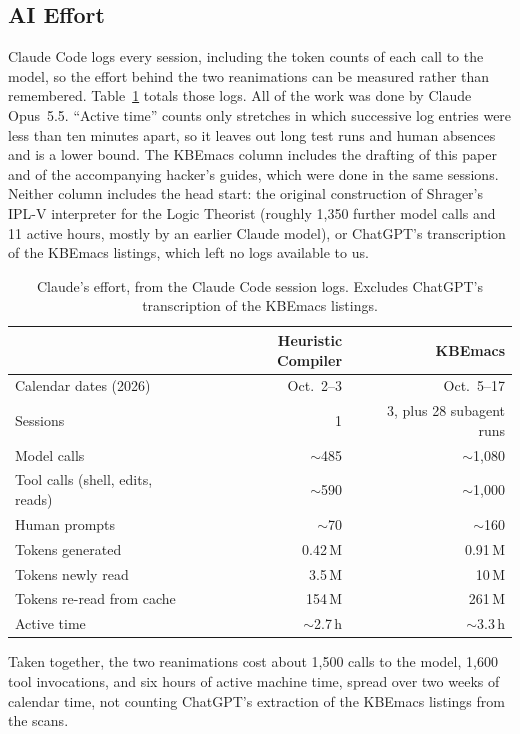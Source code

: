 \documentclass[11pt]{article}
\begin{document}
\subsection{AI Effort}
\label{app:effort}

Claude Code logs every session, including the token counts of each
call to the model, so the effort behind the two reanimations can be
measured rather than remembered. Table~\ref{tab:effort} totals those
logs. All of the work was done by Claude Opus~5.5. ``Active time''
counts only stretches in which successive log entries were less than
ten minutes apart, so it leaves out long test runs and human absences
and is a lower bound. The KBEmacs column includes the drafting of this
paper and of the accompanying hacker's guides, which were done in the
same sessions. Neither column includes the head start: the original
construction of Shrager's IPL-V interpreter for the Logic Theorist
(roughly 1,350 further model calls and 11 active hours, mostly by an
earlier Claude model), or ChatGPT's transcription of the KBEmacs
listings, which left no logs available to us.

\begin{table}[H]
\centering
\caption{Claude's effort, from the Claude Code session logs. Excludes ChatGPT's transcription of the KBEmacs listings.}
\label{tab:effort}
\footnotesize
\begin{tabular}{@{}lrr@{}}
\toprule
 & \textbf{Heuristic Compiler} & \textbf{KBEmacs} \\ \midrule
Calendar dates (2026) & Oct.\ 2--3 & Oct.\ 5--17 \\
Sessions & 1 & 3, plus 28 subagent runs \\
Model calls & $\sim$485 & $\sim$1,080 \\
Tool calls (shell, edits, reads) & $\sim$590 & $\sim$1,000 \\
Human prompts & $\sim$70 & $\sim$160 \\
Tokens generated & 0.42\,M & 0.91\,M \\
Tokens newly read & 3.5\,M & 10\,M \\
Tokens re-read from cache & 154\,M & 261\,M \\
Active time & $\sim$2.7\,h & $\sim$3.3\,h \\ \bottomrule
\end{tabular}
\end{table}

Taken together, the two reanimations cost about 1,500 calls to the
model, 1,600 tool invocations, and six hours of active machine time,
spread over two weeks of calendar time, not counting ChatGPT's
extraction of the KBEmacs listings from the scans.
\end{document}
